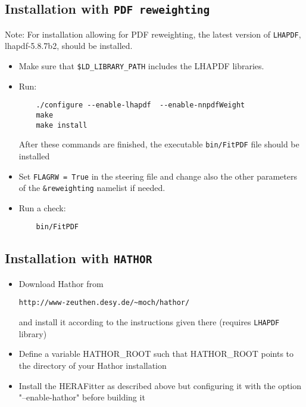 \subsection{Installation with {\tt PDF reweighting}}\label{sec:install_nnpdfrweight}

Note: For installation allowing for PDF reweighting, the latest version of {\tt LHAPDF}, lhapdf-5.8.7b2, should be installed.

\begin{itemize}
\item Make sure that {\tt \$LD\_LIBRARY\_PATH} includes the LHAPDF libraries.
\item Run:
\begin{verbatim}
    ./configure --enable-lhapdf  --enable-nnpdfWeight
    make 
    make install
\end{verbatim}
After these commands are finished, the executable {\tt bin/FitPDF} 
file should be installed
\item Set {\tt FLAGRW = True} in the steering file and change also the other parameters of the {\tt \&reweighting} namelist if needed.
\item  Run a check:
\begin{verbatim}
    bin/FitPDF 
\end{verbatim}
\end{itemize}


\subsection{Installation with {\tt HATHOR}}

 \begin{itemize}
  \item Download Hathor from 
\begin{verbatim}
http://www-zeuthen.desy.de/~moch/hathor/
\end{verbatim}
     and install it according to the instructions given there
     (requires \verb'LHAPDF' library)

  \item Define a variable HATHOR\_ROOT  such that HATHOR\_ROOT  points to the
     directory of your Hathor installation

  \item Install the HERAFitter as described above but configuring it
     with the option "--enable-hathor" before building it
 \end{itemize}


